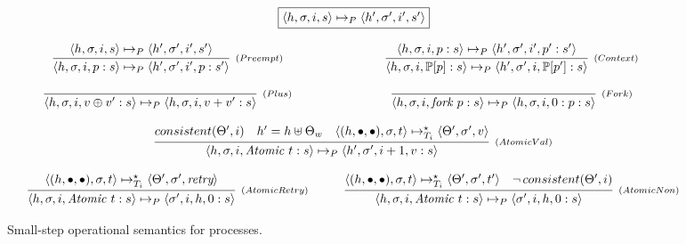 \documentclass{jfp1}
\newcommand{\Fork}{\textit{fork }}
\newcommand{\Atomic}{\textit{Atomic }}
\newcommand{\Retry}{\textit{retry}}
\newcommand{\EvalCtxProc}[1]{\ensuremath{\mathbb{P}[#1]}}
\newcommand{\TStepClos}[9]{\ensuremath{\langle #2, #3, #4 \rangle
    \mapsto^{\star}_{T_{#5}} \langle #7, #8, #9 \rangle}}
\newcommand{\ProcStep}[8]{\ensuremath{\langle #1 , #2, #3,#4 \rangle
    \mapsto_{P} \langle #5, #6, #7, #8 \rangle}}
\begin{document}
     \begin{figure}[h]
        \[
             \begin{array}{c}
                  \fbox{\ProcStep{h}{\sigma}{i}{s}{h'}{\sigma'}{i'}{s'}} \\ \\
                  \begin{array}{ccc}
                      \infer[_{(Preempt)}]
                               {\ProcStep{h}{\sigma}{i}{p:s}{h'}{\sigma'}{i'}{p : s'}}
                               {\ProcStep{h}{\sigma}{i}{s}{h'}{\sigma'}{i'}{s'}} & \:\:\:\: &
                      \infer[_{(Context)}]
                               {\ProcStep{h}{\sigma}{i}{\EvalCtxProc{p} : s}{h'}{\sigma'}{i}{\EvalCtxProc{p'}:s}}                                       
                               {\ProcStep{h}{\sigma}{i}{p : s}{h'}{\sigma'}{i'}{p':s'}} \\ \\                                       
                    \infer[_{(Plus)}]
                             {\ProcStep{h}{\sigma}{i}{v \oplus v' : s}{h}{\sigma}{i}{v + v'
                    : s}}
                             {} & & 
                    \infer[_{(Fork)}]
                             {\ProcStep{h}{\sigma}{i}{\Fork p : s}{h}{\sigma}{i}{0 : p :
                                                  s}}{}\\ \\
                    \multicolumn{3}{c}{
                    \infer[_{(AtomicVal)}]
                             {\ProcStep{h}{\sigma}{i}{\Atomic t :
                    s}{h'}{\sigma'}{i + 1}{v : s}}
                             {
                               consistent(\Theta',i) &
                               h' = h \uplus \Theta_w &
                                \TStepClos{h}{(h,\bullet,\bullet)}{\sigma}{t}{i}{h}{\Theta'}{\sigma'}{v}
                                }}\\ \\
                    \infer[_{(AtomicRetry)}]
                              {\ProcStep{h}{\sigma}{i}{\Atomic t : s}{\sigma'}{i}{h}{0 : s}}                                
                              {\TStepClos{h}{(h,\bullet,\bullet)}{\sigma}{t}{i}{h}{\Theta'}{\sigma'}{\Retry}}
                              & &
                    \infer[_{(AtomicNon)}]
                             {\ProcStep{h}{\sigma}{i}{\Atomic t :
                                  s}{\sigma'}{i}{h}{0 : s}}
                             {\TStepClos{h}{(h,\bullet,\bullet)}{\sigma}{t}{i}{h}{\Theta'}{\sigma'}{t'}
                                  & 
                             \neg\,consistent(\Theta',i)}     
                  \end{array}
             \end{array}
        \]
        \centering
        \caption{Small-step operational semantics for processes.}
        \label{fig:small-step-processes}
     \end{figure}




\label{lastpage}
\end{document}
